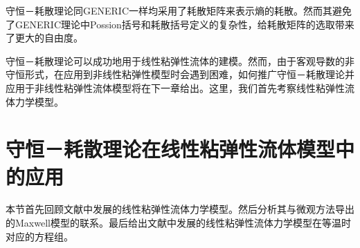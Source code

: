 	守恒－耗散理论同GENERIC一样均采用了耗散矩阵来表示熵的耗散。然而其避免了GENERIC理论中Possion括号和耗散括号定义的复杂性，给耗散矩阵的选取带来了更大的自由度。%

	守恒－耗散理论可以成功地用于线性粘弹性流体的建模。然而，由于客观导数的非守恒形式，在应用到非线性粘弹性模型时会遇到困难，如何推广守恒－耗散理论并应用于非线性粘弹性流体模型将在下一章给出。这里，我们首先考察线性粘弹性流体力学模型。

	\section{守恒－耗散理论在线性粘弹性流体模型中的应用}
	本节首先回顾文献\cite{zhu2014conservation}中发展的线性粘弹性流体力学模型。然后分析其与微观方法导出的Maxwell模型的联系。最后给出文献\cite{zhu2014conservation}中发展的线性粘弹性流体力学模型在等温时对应的方程组。
